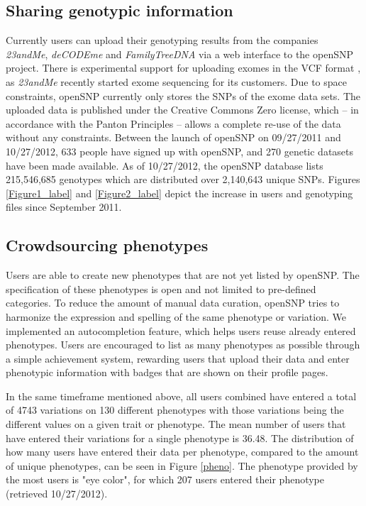 \documentclass[10pt]{article}
\begin{document}
\subsection*{Sharing genotypic information}
Currently users can upload their genotyping results from the companies \textit{23andMe}, \textit{deCODEme} and \textit{FamilyTreeDNA} via a web interface to the openSNP 
project. There is experimental support for uploading exomes in the VCF format \cite{Danecek01082011}, as \textit{23andMe} recently started exome sequencing for its customers. Due to space constraints, openSNP currently only stores the SNPs of the exome data sets.
The uploaded data is published under the Creative Commons Zero license, 
which -- in accordance with the Panton Principles \cite{10.1371/journal.pbio.1001195} -- 
allows a complete re-use of the data without any constraints.
Between the launch of openSNP on 09/27/2011 and 10/27/2012, 633 people have signed 
up with openSNP, and 270 genetic datasets have been made available. As of 10/27/2012, the openSNP database lists 215,546,685 genotypes which are distributed over 2,140,643 unique SNPs.
Figures \ref{Figure1_label} and \ref{Figure2_label} depict the increase in users and genotyping files since September 2011.


\subsection*{Crowdsourcing phenotypes}
Users are able to create new phenotypes that are not yet 
listed by openSNP. 
The specification of these phenotypes is open and not limited 
to pre-defined categories. To reduce the amount of manual data curation, openSNP tries to harmonize 
the expression and spelling of the same phenotype or variation. We implemented an 
autocompletion feature, which helps users reuse already entered phenotypes.
Users are encouraged to list as many phenotypes as possible through a simple 
achievement system, rewarding users that upload their data and enter phenotypic 
information with badges that are shown on their profile pages.

In the same timeframe mentioned above, all users combined have 
entered a total of 4743 variations on 130 different phenotypes with those variations being 
the different values on a given trait or phenotype. The mean number of users that have entered their variations for a single phenotype 
is 36.48. The distribution of how many users have 
entered their data per phenotype, compared to the amount of unique phenotypes, can be seen in Figure \ref{pheno}. The phenotype provided by the most users is "eye color", for which 207 users entered their phenotype (retrieved 10/27/2012). 
\end{document}
